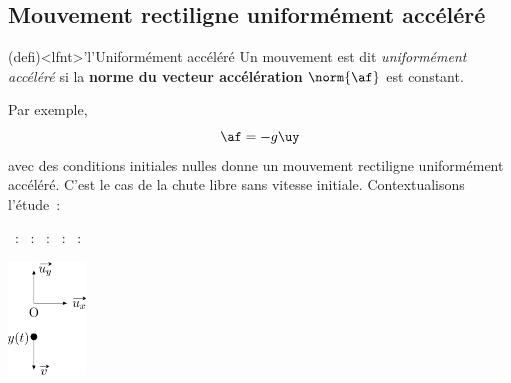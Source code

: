 \documentclass[../../main/main.tex]{subfiles}
\begin{document}
\subsection{Mouvement rectiligne uniformément accéléré}
\begin{tcb*}(defi)<lfnt>'l'{Uniformément accéléré}
	Un mouvement est dit \textit{uniformément accéléré} si la \textbf{norme du
		vecteur accélération} $\norm{\af}$ est constant.
\end{tcb*}
Par exemple,
\[\af = -g\uy\]
avec des conditions initiales nulles donne un mouvement rectiligne uniformément
accéléré. C'est le cas de la chute libre sans vitesse initiale. Contextualisons
l'étude~:
\smallbreak
\noindent
\begin{minipage}{0.80\linewidth}
	\begin{itemize}
		~: 
		~: 
		~: 
		~:
		~:
	\end{itemize}
\end{minipage}
\hfill
\begin{minipage}{0.19\linewidth}
	\begin{center}
		\includegraphics[height=3cm]{nov_init}
	\end{center}
\end{minipage}
\end{document}
